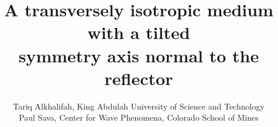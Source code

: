 




\title{A transversely isotropic medium with a tilted \\ symmetry axis normal to the reflector}
\author{
Tariq Alkhalifah, King Abdulah University of Science and Technology \\
Paul Sava, Center for Wave Phenomena, Colorado School of Mines}












%



